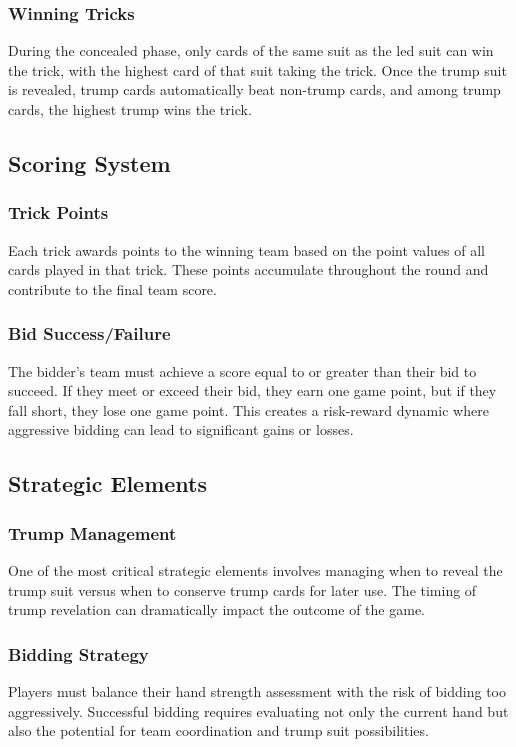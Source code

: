 \documentclass[conference]{IEEEtran}
\begin{document}
\subsubsection{Winning Tricks}
During the concealed phase, only cards of the same suit as the led suit can win the trick, with the highest card of that suit taking the trick. Once the trump suit is revealed, trump cards automatically beat non-trump cards, and among trump cards, the highest trump wins the trick. 


\subsection{Scoring System}

\subsubsection{Trick Points}
Each trick awards points to the winning team based on the point values of all cards played in that trick. These points accumulate throughout the round and contribute to the final team score.

\subsubsection{Bid Success/Failure}
The bidder's team must achieve a score equal to or greater than their bid to succeed. If they meet or exceed their bid, they earn one game point, but if they fall short, they lose one game point. This creates a risk-reward dynamic where aggressive bidding can lead to significant gains or losses. 

\subsection{Strategic Elements}

\subsubsection{Trump Management}
One of the most critical strategic elements involves managing when to reveal the trump suit versus when to conserve trump cards for later use. The timing of trump revelation can dramatically impact the outcome of the game.

\subsubsection{Bidding Strategy}
Players must balance their hand strength assessment with the risk of bidding too aggressively. Successful bidding requires evaluating not only the current hand but also the potential for team coordination and trump suit possibilities.
\end{document}
